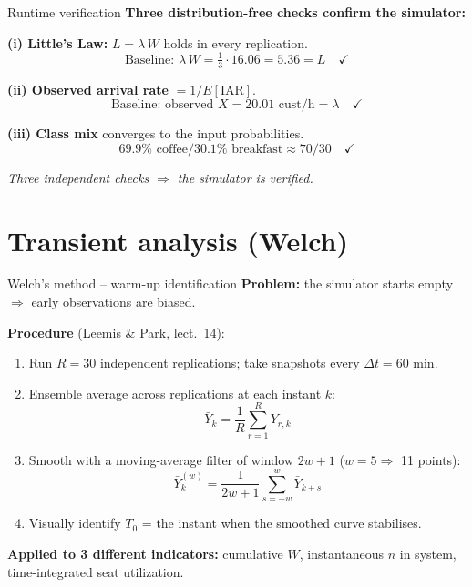 \documentclass[10pt,aspectratio=169]{beamer}
\begin{document}
\begin{frame}{Runtime verification}
\textbf{Three distribution-free checks confirm the simulator:}

\vspace{0.5cm}
\textbf{(i) Little's Law:} $L = \lambda\,W$ holds in every replication.
\[
\text{Baseline: } \lambda\,W = \tfrac{1}{3} \cdot 16.06 = 5.36 = L \quad \checkmark
\]

\vspace{0.3cm}
\textbf{(ii) Observed arrival rate} $= 1 / E[\text{IAR}]$.
\[
\text{Baseline: observed } X = 20.01 \text{ cust/h} = \lambda \quad \checkmark
\]

\vspace{0.3cm}
\textbf{(iii) Class mix} converges to the input probabilities.
\[
69.9\% \text{ coffee} / 30.1\% \text{ breakfast} \approx 70/30 \quad \checkmark
\]

\vspace{0.3cm}
\hfill\textit{Three independent checks $\Rightarrow$ the simulator is verified.}
\end{frame}

\section{Transient analysis (Welch)}
\begin{frame}{Welch's method -- warm-up identification}
\textbf{Problem:} the simulator starts empty $\Rightarrow$ early observations are biased.

\vspace{0.4cm}
\textbf{Procedure} (Leemis \& Park, lect.\ 14):
\begin{enumerate}
  \item Run $R = 30$ independent replications; take snapshots every $\Delta t = 60$ min.
  \item Ensemble average across replications at each instant $k$:
  \[
  \bar Y_k = \frac{1}{R}\sum_{r=1}^{R} Y_{r,k}
  \]
  \item Smooth with a moving-average filter of window $2w+1$ ($w = 5 \Rightarrow$ 11 points):
  \[
  \bar Y_k^{(w)} = \frac{1}{2w+1}\sum_{s=-w}^{w} \bar Y_{k+s}
  \]
  \item Visually identify $T_0$ = the instant when the smoothed curve stabilises.
\end{enumerate}

\vspace{0.3cm}
\textbf{Applied to 3 different indicators:} cumulative $W$, instantaneous $n$ in system,
time-integrated seat utilization.
\end{frame}
\end{document}
